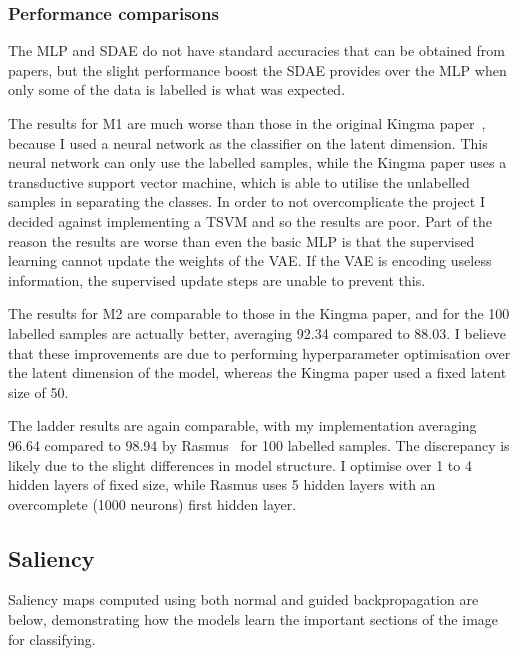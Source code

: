 \subsubsection{Performance comparisons}
The MLP and SDAE do not have standard accuracies that can be obtained from papers, but the slight performance boost the SDAE provides 
over the MLP when only some of the data is labelled is what was expected.

The results for M1 are much worse than those in the original Kingma paper~\cite{DBLP:journals/corr/KingmaRMW14}, because I used
a neural network as the classifier on the latent dimension. This neural network can only use the labelled samples, while the Kingma 
paper uses a transductive support vector machine, which is able to utilise the unlabelled samples in separating the classes. In order to
not overcomplicate the project I decided against implementing a TSVM and so the results are poor. Part of the reason the results are worse 
than even the basic MLP is that the supervised learning cannot update the weights of the VAE. If the VAE is encoding useless information, 
the supervised update steps are unable to prevent this.

The results for M2 are comparable to those in the Kingma paper, and for the 100 labelled samples are actually better, averaging 92.34 
compared to 88.03. I believe that these improvements are due to performing hyperparameter optimisation over the latent dimension of the 
model, whereas the Kingma paper used a fixed latent size of 50.

The ladder results are again comparable, with my implementation averaging 96.64 compared to 98.94 by Rasmus~\cite{DBLP:journals/corr/RasmusVHBR15}
for 100 labelled samples.
The discrepancy is likely due to the slight differences in model structure. I optimise over 1 to 4 hidden layers of fixed size,
while Rasmus uses 5 hidden layers with an overcomplete (1000 neurons) first hidden layer.

\subsection{Saliency}

Saliency maps computed using both normal and guided backpropagation are below, demonstrating how the models learn the important 
sections of the image for classifying.

